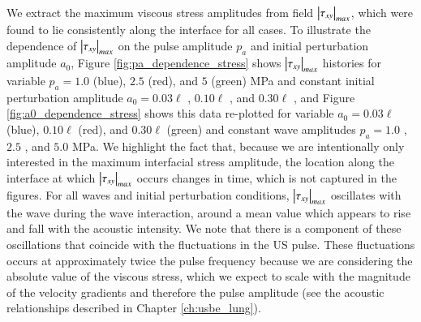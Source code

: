 We extract the maximum viscous stress amplitudes from field
$\left|\tau_{xy}\right|_{max}$, which were found to lie consistently along
the interface for all cases. To illustrate the dependence of
$\left|\tau_{xy}\right|_{max}$ on the pulse amplitude $p_a$ and initial
perturbation amplitude $a_0$, Figure \ref{fig:pa_dependence_stress}
shows $\left|\tau_{xy}\right|_{max}$ histories for variable $p_a = 1.0$
(blue), $2.5$ (red), and $5$ (green) MPa and constant initial
perturbation amplitude $a_0=0.03\ell$
, $0.10\ell$
, and $0.30\ell$
, and Figure
\ref{fig:a0_dependence_stress} shows this data re-plotted for variable
$a_0 = 0.03\ell$ (blue), $0.10\ell$ (red), and $0.30\ell$ (green) and
constant wave amplitudes $p_a=1.0$ ,
$2.5$ , and $5.0$
 MPa. We highlight the fact that,
because we are intentionally only interested in the maximum
interfacial stress amplitude, the location along the interface at
which $\left|\tau_{xy}\right|_{max}$ occurs changes in time, which is not
captured in the figures. For all waves and initial perturbation
conditions, $\left|\tau_{xy}\right|_{max}$ oscillates with the wave during
the wave interaction, around a mean value which appears to rise and
fall with the acoustic intensity. We note that there is a component of
these oscillations that coincide with the fluctuations in the \ac{US}
pulse. These fluctuations occurs at approximately twice the pulse
frequency because we are considering the absolute value of the viscous
stress, which we expect to scale with the magnitude of the velocity
gradients and therefore the pulse amplitude (see the acoustic
relationships described in Chapter \ref{ch:usbe_lung}).

